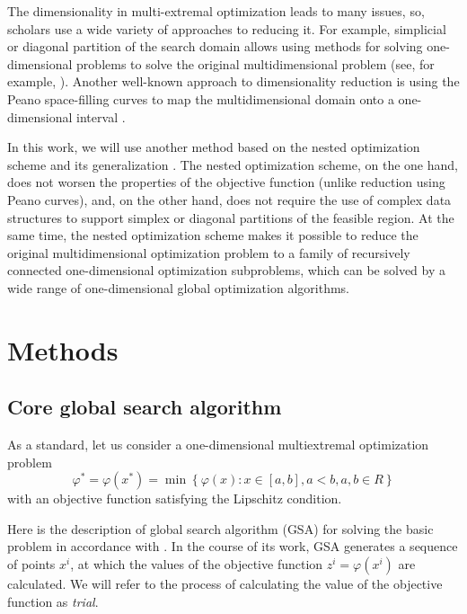 \documentclass[entropy,article,submit,moreauthors,pdftex]{Definitions/mdpi}
\begin{document}
The dimensionality in multi-extremal optimization leads to many issues, so, scholars use a wide variety of approaches to reducing it.  
For example, simplicial or diagonal partition of the search domain allows using methods for solving one-dimensional problems to solve the original multidimensional problem (see, for example,  \cite{PaulaviciusZilinskas2014,Sergeyev2017}). 
Another well-known approach to dimensionality reduction is using the Peano space-filling curves to map the multidimensional domain onto a one-dimensional interval \cite{Strongin2000,Sergeyev2013}.

In this work, we will use another method based on the nested optimization scheme \cite{Shi2000,Grishagin2001,VanDam2010,Grishagin2015} and its generalization \cite{Grishagin2016,Grishagin2016_1}.
The nested optimization scheme, on the one hand, does not worsen the properties of the objective function (unlike reduction using Peano curves), and, on the other hand, does not require the use of complex data structures to support simplex or diagonal partitions of the feasible region.
At the same time, the nested optimization scheme makes it possible to reduce the original multidimensional optimization problem to a family of recursively connected one-dimensional optimization subproblems, which can be solved by a wide range of one-dimensional global optimization algorithms.


\section{Methods}

\subsection{Core global search algorithm}\label{CoreGSA}

As a standard, let us consider a one-dimensional multiextremal optimization problem
\begin{equation}\label{uni_problem}
\varphi^\ast = \varphi(x^\ast)=\min{\left\{\varphi(x):x\in \left[a,b\right], a<b, a,b \in R
\right\}}
\end{equation}
with an objective function satisfying the Lipschitz condition. 

Here is the description of global search algorithm (GSA) for solving the basic problem in accordance with \cite{Strongin2000}.
In the course of its work, GSA generates a sequence of points  $x^i$, at which the values of the objective function  $z^i=\varphi(x^i)$ are calculated. 
We will refer to the process of calculating the value of the objective function as \textit{trial}.
\end{document}
